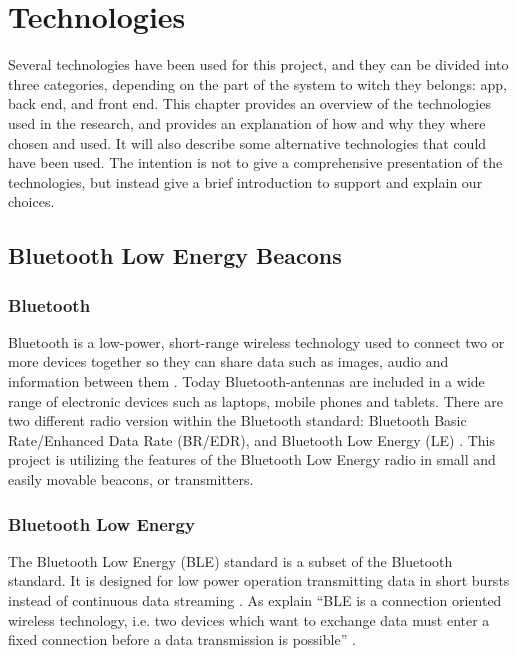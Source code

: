 \documentclass[../Main/thesis.tex]{subfiles}
\begin{document}
\chapter{Technologies}
\label{ch:technologies}

Several technologies have been used for this project, and they can be divided into three categories, depending on the part of the system to witch they belongs: app, back end, and front end.
This chapter provides an overview of the technologies used in the research, and provides an explanation of how and why they where chosen and used.
It will also describe some alternative technologies that could have been used.
The intention is not to give a comprehensive presentation of the technologies, but instead give a brief introduction to support and explain our choices.

\section{Bluetooth Low Energy Beacons}

\subsection{Bluetooth}
Bluetooth is a low-power, short-range wireless technology used to connect two or more devices together so they can share data such as images, audio and information between them \citep{bluetooth-how}.
Today Bluetooth-antennas are included in a wide range of electronic devices such as laptops, mobile phones and tablets.
There are two different radio version within the Bluetooth standard: Bluetooth Basic Rate/Enhanced Data Rate (BR/EDR), and Bluetooth Low Energy (LE) \citep{BluetoothSpecialInterestGroup2018}.
This project is utilizing the features of the Bluetooth Low Energy radio in small and easily movable beacons, or transmitters.

\subsection{Bluetooth Low Energy}
The Bluetooth Low Energy (BLE) standard is a subset of the Bluetooth standard.
It is designed for low power operation transmitting data in short bursts instead of continuous data streaming \citep{BluetoothSpecialInterestGroup2018}.
As \citeauthor{Mackensen2012} explain ``BLE is a connection oriented wireless technology, i.e. two devices  which  want  to  exchange  data  must  enter  a  fixed connection before a data transmission is possible'' \citep{Mackensen2012}.
\end{document}
